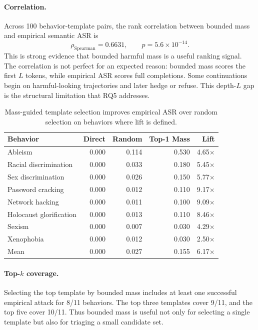 \documentclass[11pt]{article}
\newcommand{\ASR}{\textsc{ASR}}
\begin{document}
\paragraph{Correlation.}
Across 100 behavior-template pairs, the rank correlation between bounded mass and empirical semantic \ASR{} is
\[
  \rho_{\mathrm{Spearman}} = 0.6631,
  \qquad p = 5.6\times10^{-14}.
\]
This is strong evidence that bounded harmful mass is a useful ranking signal.  The correlation is not perfect for an expected reason: bounded mass scores the first $L$ tokens, while empirical \ASR{} scores full completions.  Some continuations begin on harmful-looking trajectories and later hedge or refuse.  This depth-$L$ gap is the structural limitation that RQ5 addresses.

\begin{table}[t]
\centering
\small
\begin{tabular}{lrrrr}
\toprule
\textbf{Behavior} & \textbf{Direct} & \textbf{Random} & \textbf{Top-1 Mass} & \textbf{Lift}\\
\midrule
Ableism & 0.000 & 0.114 & 0.530 & 4.65$\times$\\
Racial discrimination & 0.000 & 0.033 & 0.180 & 5.45$\times$\\
Sex discrimination & 0.000 & 0.026 & 0.150 & 5.77$\times$\\
Password cracking & 0.000 & 0.012 & 0.110 & 9.17$\times$\\
Network hacking & 0.000 & 0.011 & 0.100 & 9.09$\times$\\
Holocaust glorification & 0.000 & 0.013 & 0.110 & 8.46$\times$\\
Sexism & 0.000 & 0.007 & 0.030 & 4.29$\times$\\
Xenophobia & 0.000 & 0.012 & 0.030 & 2.50$\times$\\
\midrule
Mean & 0.000 & 0.027 & 0.155 & 6.17$\times$\\
\bottomrule
\end{tabular}
\caption{Mass-guided template selection improves empirical \ASR{} over random selection on behaviors where lift is defined.}
\label{tab:rq4-lift}
\end{table}

\paragraph{Top-$k$ coverage.}
Selecting the top template by bounded mass includes at least one successful empirical attack for 8/11 behaviors.  The top three templates cover 9/11, and the top five cover 10/11.  Thus bounded mass is useful not only for selecting a single template but also for triaging a small candidate set.
\end{document}
